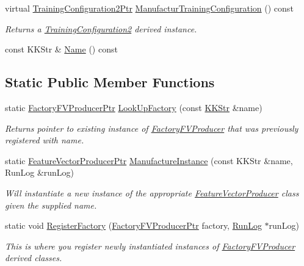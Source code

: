 \begin{DoxyCompactItemize}
virtual \hyperlink{namespace_k_k_m_l_l_a5da4b334417f8c9e4e2fd5924da7fe62}{Training\+Configuration2\+Ptr} \hyperlink{class_k_k_m_l_l_1_1_factory_f_v_producer_a3638e312813fd78c2a4ead4fb71e2537}{Manufactur\+Training\+Configuration} () const 
\begin{DoxyCompactList}\small\item\em Returns a \textquotesingle{}\hyperlink{class_k_k_m_l_l_1_1_training_configuration2}{Training\+Configuration2}\textquotesingle{} derived instance. \end{DoxyCompactList}\item 
const K\+K\+Str \& \hyperlink{class_k_k_m_l_l_1_1_factory_f_v_producer_adbdfab027b335694c46d969d84ea1213}{Name} () const 
\end{DoxyCompactItemize}
\subsection*{Static Public Member Functions}
\begin{DoxyCompactItemize}
\item 
static \hyperlink{class_k_k_m_l_l_1_1_factory_f_v_producer_a5a9f1ef1b6789f2b6379a8cdb81ac964}{Factory\+F\+V\+Producer\+Ptr} \hyperlink{class_k_k_m_l_l_1_1_factory_f_v_producer_ab568f702e72172335c791744123bd63d}{Look\+Up\+Factory} (const \hyperlink{class_k_k_b_1_1_k_k_str}{K\+K\+Str} \&name)
\begin{DoxyCompactList}\small\item\em Returns pointer to existing instance of \textquotesingle{}\hyperlink{class_k_k_m_l_l_1_1_factory_f_v_producer}{Factory\+F\+V\+Producer}\textquotesingle{} that was previously registered with \textquotesingle{}name\textquotesingle{}. \end{DoxyCompactList}\item 
static \hyperlink{namespace_k_k_m_l_l_a5fcda00f9ffbd9fb40e02f013be900e3}{Feature\+Vector\+Producer\+Ptr} \hyperlink{class_k_k_m_l_l_1_1_factory_f_v_producer_a2044e7ede397e8b0df62d01b79e83e05}{Manufacture\+Instance} (const K\+K\+Str \&name, Run\+Log \&run\+Log)
\begin{DoxyCompactList}\small\item\em Will instantiate a new instance of the appropriate \textquotesingle{}\hyperlink{class_k_k_m_l_l_1_1_feature_vector_producer}{Feature\+Vector\+Producer}\textquotesingle{} class given the supplied name. \end{DoxyCompactList}\item 
static void \hyperlink{class_k_k_m_l_l_1_1_factory_f_v_producer_af101ca518d5ca7083966502ed6ba2ee4}{Register\+Factory} (\hyperlink{class_k_k_m_l_l_1_1_factory_f_v_producer_a5a9f1ef1b6789f2b6379a8cdb81ac964}{Factory\+F\+V\+Producer\+Ptr} factory, \hyperlink{class_k_k_b_1_1_run_log}{Run\+Log} $\ast$run\+Log)
\begin{DoxyCompactList}\small\item\em This is where you register newly instantiated instances of \textquotesingle{}\hyperlink{class_k_k_m_l_l_1_1_factory_f_v_producer}{Factory\+F\+V\+Producer}\textquotesingle{} derived classes. \end{DoxyCompactList}\end{DoxyCompactItemize}
